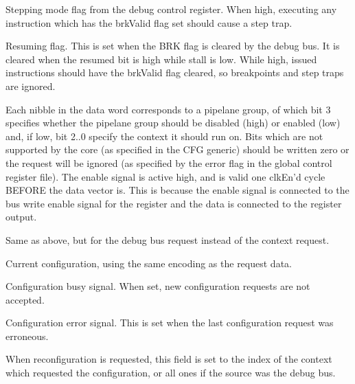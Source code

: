 \ifaceSubGroup{}
Stepping mode flag from the debug control register. When high, executing any 
instruction which has the brkValid flag set should cause a step trap.

\ifaceSubGroup{}
Resuming flag. This is set when the BRK flag is cleared by the debug bus. It is 
cleared when the resumed bit is high while stall is low. While high, issued 
instructions should have the brkValid flag cleared, so breakpoints and step 
traps are ignored.
    
\ifaceSubGroup{}
Each nibble in the data word corresponds to a pipelane group, of which bit 3 
specifies whether the pipelane group should be disabled (high) or enabled (low) 
and, if low, bit 2..0 specify the context it should run on. Bits which are not 
supported by the core (as specified in the CFG generic) should be written zero 
or the request will be ignored (as specified by the error flag in the global 
control register file). The enable signal is active high, and is valid one 
clkEn'd cycle BEFORE the data vector is. This is because the enable signal is 
connected to the bus write enable signal for the register and the data is 
connected to the register output.

\ifaceSubGroup{}
Same as above, but for the debug bus request instead of the context request.

\ifaceSubGroup{}
Current configuration, using the same encoding as the request data.
    
\ifaceSubGroup{}
Configuration busy signal. When set, new configuration requests are not 
accepted.
    
\ifaceSubGroup{}
Configuration error signal. This is set when the last configuration request was 
erroneous.
    
\ifaceSubGroup{}
When reconfiguration is requested, this field is set to the index of the context 
which requested the configuration, or all ones if the source was the debug bus.

